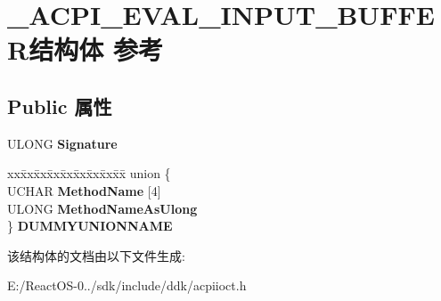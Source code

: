 \hypertarget{struct___a_c_p_i___e_v_a_l___i_n_p_u_t___b_u_f_f_e_r}{}\section{\+\_\+\+A\+C\+P\+I\+\_\+\+E\+V\+A\+L\+\_\+\+I\+N\+P\+U\+T\+\_\+\+B\+U\+F\+F\+E\+R结构体 参考}
\label{struct___a_c_p_i___e_v_a_l___i_n_p_u_t___b_u_f_f_e_r}
\subsection*{Public 属性}
\begin{DoxyCompactItemize}
\item 
\mbox{\label{struct___a_c_p_i___e_v_a_l___i_n_p_u_t___b_u_f_f_e_r_ae3a433ea587a53dfe4acdadc11e6bc20}} 
U\+L\+O\+NG {\bfseries Signature}
\item 
\mbox{\label{struct___a_c_p_i___e_v_a_l___i_n_p_u_t___b_u_f_f_e_r_a8314eee86c98468f2518fb732d2ad88f}} 
\begin{tabbing}
xx\=xx\=xx\=xx\=xx\=xx\=xx\=xx\=xx\=\kill
union \{\\
\>UCHAR {\bfseries MethodName} \mbox{[}4\mbox{]}\\
\>ULONG {\bfseries MethodNameAsUlong}\\
\} {\bfseries DUMMYUNIONNAME}\\

\end{tabbing}\end{DoxyCompactItemize}


该结构体的文档由以下文件生成\+:\begin{DoxyCompactItemize}
\item 
E\+:/\+React\+O\+S-\/0../sdk/include/ddk/acpiioct.\+h\end{DoxyCompactItemize}

